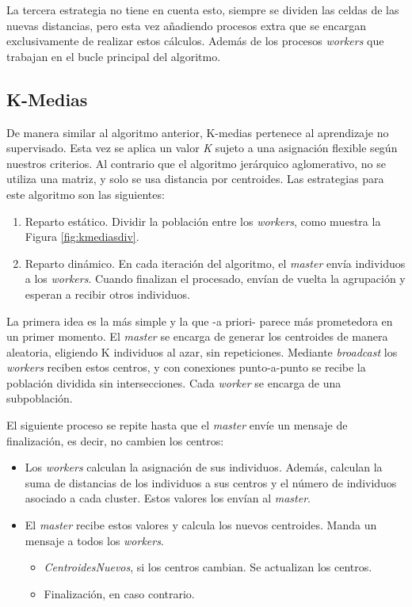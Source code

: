 		La tercera estrategia no tiene en cuenta esto, siempre se dividen las celdas de las nuevas distancias, pero esta vez añadiendo procesos extra que se encargan exclusivamente de realizar estos cálculos. Además de los procesos \textit{workers} que trabajan en el bucle principal del algoritmo.
		
		
	\subsection{K-Medias}
	\label{cap:3_2_2}
		De manera similar al algoritmo anterior, K-medias pertenece al aprendizaje no supervisado. Esta vez se aplica un valor \textit{K} sujeto a una asignación flexible según nuestros criterios. Al contrario que el algoritmo jerárquico aglomerativo, no se utiliza una matriz, y solo se usa distancia por centroides. Las estrategias para este algoritmo son las siguientes:		
		
		
		\begin{enumerate}
			\item Reparto estático. Dividir la población entre los \textit{workers}, como muestra la Figura \ref{fig:kmediasdiv}. 
			\item Reparto dinámico. En cada iteración del algoritmo, el \textit{master} envía individuos a los \textit{workers}. Cuando finalizan el procesado, envían de vuelta la agrupación y esperan a recibir otros individuos. 
		\end{enumerate}
		
		La primera idea es la más simple y la que -a priori- parece más prometedora en un primer momento. El \textit{master} se encarga de generar los centroides de manera aleatoria, eligiendo K individuos al azar, sin repeticiones. Mediante \textit{broadcast} los \textit{workers} reciben estos centros, y con conexiones punto-a-punto se recibe la población dividida sin intersecciones. Cada \textit{worker} se encarga de una subpoblación. 
		
				
		\begin{mdframed}[roundcorner=5pt]
			El siguiente proceso se repite hasta que el \textit{master} envíe un mensaje de finalización, es decir, no cambien los centros:	
			\begin{itemize}
				\setlength\itemsep{0em} 
				\item Los \textit{workers} calculan la asignación de sus individuos. Además, calculan la suma de distancias de los individuos a sus centros y el número de individuos asociado a cada cluster. Estos valores los envían al \textit{master}.
				\item El \textit{master} recibe estos valores y calcula los nuevos centroides. Manda un mensaje a todos los \textit{workers}. 
				\begin{itemize}
					\setlength\itemsep{0em} 
					\item \textit{CentroidesNuevos}, si los centros cambian. Se actualizan los centros.
					\item Finalización, en caso contrario.
				\end{itemize}
			\end{itemize}
		\end{mdframed}
		
